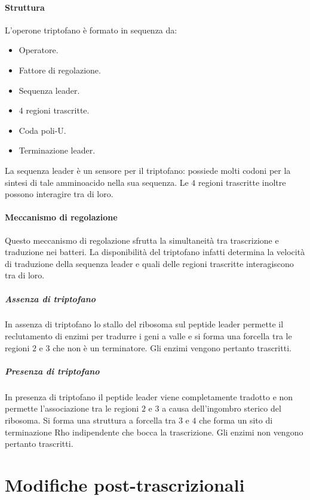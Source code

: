			\paragraph{Struttura}
			L'operone triptofano \`e formato in sequenza da:
			\begin{multicols}{2}
				\begin{itemize}
					\item Operatore.
					\item Fattore di regolazione.
					\item Sequenza leader.
					\item $4$ regioni trascritte.
					\item Coda poli-U.
					\item Terminazione leader.
				\end{itemize}
			\end{multicols}
			La sequenza leader \`e un sensore per il triptofano: possiede molti codoni per la sintesi di tale amminoacido nella sua sequenza.
			Le $4$ regioni trascritte inoltre possono interagire tra di loro.

			\paragraph{Meccanismo di regolazione}
			Questo meccanismo di regolazione sfrutta la simultaneit\`a tra trascrizione e traduzione nei batteri.
			La disponibilit\`a del triptofano infatti determina la velocit\`a di traduzione della sequenza leader e quali delle regioni trascritte interagiscono tra di loro.

				\subparagraph{Assenza di triptofano}
				In assenza di triptofano lo stallo del ribosoma sul peptide leader permette il reclutamento di enzimi per tradurre i geni a valle e si forma una forcella tra le regioni $2$ e $3$ che non \`e un terminatore.
				Gli enzimi vengono pertanto trascritti.

				\subparagraph{Presenza di triptofano}
				In presenza di triptofano il peptide leader viene completamente tradotto e non permette l'associazione tra le regioni $2$ e $3$ a causa dell'ingombro sterico del ribosoma.
				Si forma una struttura a forcella tra $3$ e $4$ che forma un sito di terminazione Rho indipendente che bocca la trascrizione.
				Gli enzimi non vengono pertanto trascritti.

\section{Modifiche post-trascrizionali}

